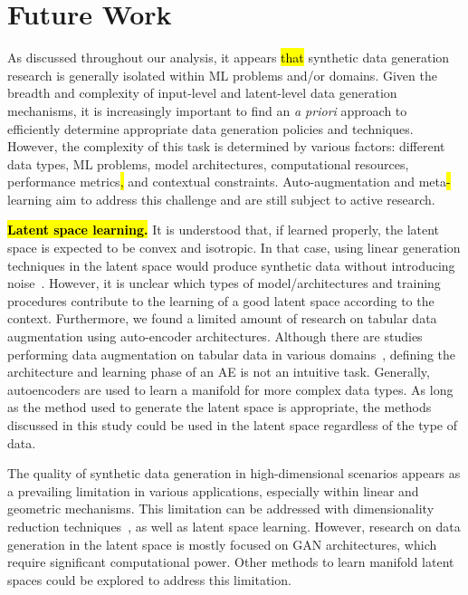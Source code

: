 \section{Future Work}\label{sec:future-work}

As discussed throughout our analysis, it appears \hl{that} synthetic data
generation research is generally isolated within ML problems and/or domains.
Given the breadth and complexity of input-level and latent-level data
generation mechanisms, it is increasingly important to find an \textit{a
priori} approach to efficiently determine appropriate data generation policies
and techniques. However, the complexity of this task is determined by various
factors: different data types, ML problems, model architectures, computational
resources, performance metrics\hl{,} and contextual constraints.
Auto-augmentation and meta\hl{-}learning aim to address this challenge and are
still subject to active research.

\hl{\textbf{Latent space learning.}} It is understood that, if learned
properly, the latent space is expected to be convex and isotropic. In that
case, using linear generation techniques in the latent space would produce
synthetic data without introducing noise~\cite{cheung2020modals}. However, it
is unclear which types of model/architectures and training procedures
contribute to the learning of a good latent space according to the context.
Furthermore, we found a limited amount of research on tabular data
augmentation using auto-encoder architectures. Although there are studies
performing data augmentation on tabular data in various
domains~\cite{delgado2021deep}, defining the architecture and learning phase
of an AE is not an intuitive task. Generally, autoencoders are used to learn a
manifold for more complex data types. As long as the method used to generate
the latent space is appropriate, the methods discussed in this study could be
used in the latent space regardless of the type of data.

The quality of synthetic data generation in high-dimensional scenarios appears
as a prevailing limitation in various applications, especially within linear
and geometric mechanisms. This limitation can be addressed with dimensionality
reduction techniques~\cite{roccetti2021alternative}, as well as latent space
learning.  However, research on data generation in the latent space is mostly
focused on GAN architectures, which require significant computational power.
Other methods to learn manifold latent spaces could be explored to address
this limitation.

